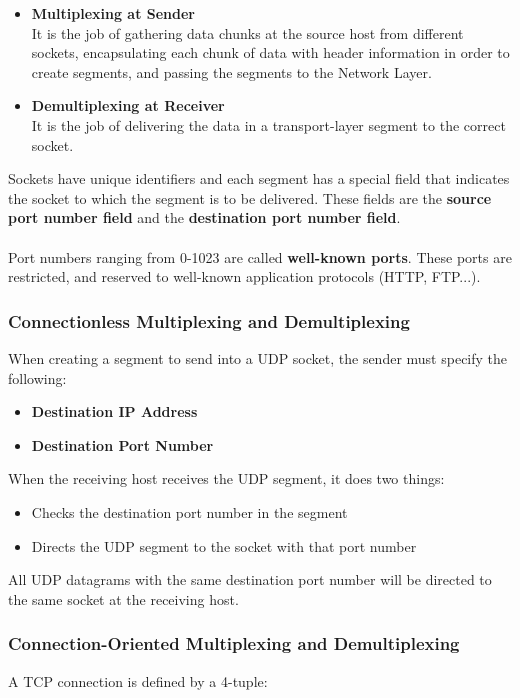 \documentclass{article}
\begin{document}
\begin{itemize}
	\item \textbf{Multiplexing at Sender}
	\vspace{.2cm} \\
	It is the job of gathering data chunks at the source host from different sockets, encapsulating each chunk of data with header information in order to create segments, and passing the segments to the Network Layer.
	
	\item \textbf{Demultiplexing at Receiver}
	\vspace{.2cm} \\
	It is the job of delivering the data in a transport-layer segment to the correct socket.
\end{itemize}
Sockets have unique identifiers and each segment has a special field that indicates the socket to which the segment is to be delivered. These fields are the \textbf{source port number field} and the \textbf{destination port number field}. \\ \\
Port numbers ranging from 0-1023 are called \textbf{well-known ports}. These ports are restricted, and reserved to well-known application protocols (HTTP, FTP...).

\subsubsection{Connectionless Multiplexing and Demultiplexing}
When creating a segment to send into a UDP socket, the sender must specify the following:

\begin{itemize}
	\item \textbf{Destination IP Address}
	\item \textbf{Destination Port Number}
\end{itemize}
When the receiving host receives the UDP segment, it does two things:

\begin{itemize}
	\item Checks the destination port number in the segment
	\item Directs the UDP segment to the socket with that port number
\end{itemize}
All UDP datagrams with the same destination port number will be directed to the same socket at the receiving host.

\subsubsection{Connection-Oriented Multiplexing and Demultiplexing}
A TCP connection is defined by a 4-tuple:
\end{document}
